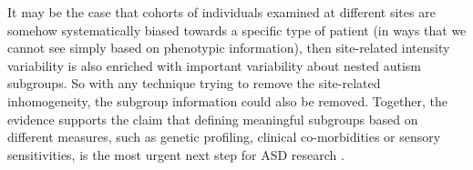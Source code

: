 It may be the case that cohorts of individuals examined at different sites are somehow systematically biased towards a specific type of patient (in ways that we cannot see simply based on phenotypic information), then site-related intensity variability is also enriched with important variability about nested autism subgroups. So with any technique trying to remove the site-related inhomogeneity, the subgroup information could also be removed. Together, the evidence supports the claim that defining meaningful subgroups based on different measures, such as genetic profiling, clinical co-morbidities or sensory sensitivities, is the most urgent next step for \ac{ASD} research \cite{haar2014anatomical}. 
	